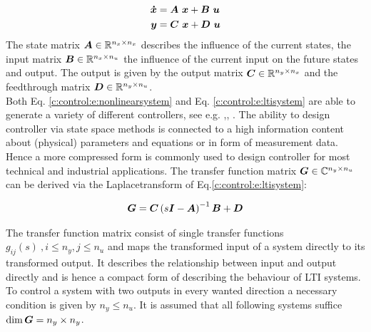 \begin{align}
\begin{split}
\mbox{\boldmath$\dot{x}$} &= \mbox{\boldmath$A$}~\mbox{\boldmath$x$} + \mbox{\boldmath$B$}~\mbox{\boldmath$u$} \\
\mbox{\boldmath$y$} &= \mbox{\boldmath$C$}~\mbox{\boldmath$x$} + \mbox{\boldmath$D$}~\mbox{\boldmath$u$}
\end{split}
\label{c:control:e:ltisystem}
\end{align}
The state matrix $\mbox{\boldmath$A$} \in \mathbb{R}^{n_x\times n_x}$ describes the influence of the current states, the input matrix $\mbox{\boldmath$B$} \in \mathbb{R}^{n_x\times n_u}$ the influence of the current input on the future states and output. The output is given by the output matrix $\mbox{\boldmath$C$} \in \mathbb{R}^{n_y\times n_x}$ and the feedthrough matrix $\mbox{\boldmath$D$} \in \mathbb{R}^{n_y\times n_u}$.\\

Both Eq. \ref{c:control:e:nonlinearsystem} and Eq. \ref{c:control:e:ltisystem} are able to generate a variety of different controllers, see e.g. \cite{Adamy2014},\cite{Lunze2014}, \cite{Lunze2016}. The ability to design controller via state space methods is connected to a high information content about (physical) parameters and equations or in form of measurement data.\\

Hence a more compressed form is commonly used to design controller for most technical and industrial applications. The transfer function matrix \cite[p.20]{Lunze2014} $\mbox{\boldmath$G$} \in \mathbb{C}^{n_y\times n_u}$ can be derived via the Laplacetransform of Eq.\ref{c:control:e:ltisystem}:

\begin{align}
\begin{split}
\mbox{\boldmath$G$} &= \mbox{\boldmath$C$} \left(s \mbox{\boldmath$I$} - \mbox{\boldmath$A$} \right)^{-1} \mbox{\boldmath$B$} + \mbox{\boldmath$D$} \\
\end{split}
\label{c:control:e:TransferFunctionMatrix}
\end{align}

The transfer function matrix consist of single transfer functions $g_{ij}(s)~, i \leq n_y, j \leq n_u$ and maps the transformed input of a system directly to its  transformed output. It describes the relationship between input and output directly and is hence a compact form of describing the behaviour of LTI systems. To control a system with two outputs in every wanted direction a necessary condition is given by $n_y \leq n_u$. It is assumed that all following systems suffice $\dim{\mbox{\boldmath$G$}} = n_y \times n_y$.  \\

